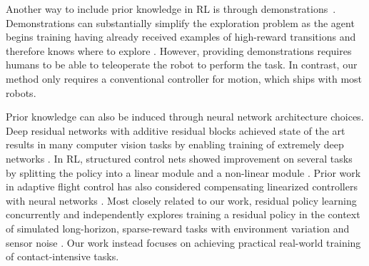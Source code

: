 Another way to include prior knowledge in RL is through demonstrations~\citep{peters2008baseball, kober2008mp, rajeswaran2018dextrous, hester17dqfd, vecerik17ddpgfd, nair2018demonstrations}. Demonstrations can substantially simplify the exploration problem as the agent begins training having already received examples of high-reward transitions and therefore knows where to explore \citep{subramanian2016efd}. However, providing demonstrations requires humans to be able to teleoperate the robot to perform the task. In contrast, our method only requires a conventional controller for motion, which ships with most robots.

Prior knowledge can also be induced through neural network architecture choices. Deep residual networks with additive residual blocks achieved state of the art results in many computer vision tasks by enabling training of extremely deep networks \citep{he2016resnet}. In RL, structured control nets showed improvement on several tasks by splitting the policy into a linear module and a non-linear module \citep{srouji18structuredcontrolnets}. Prior work in adaptive flight control has also considered compensating linearized controllers with neural networks \citep{johnson2000hedging}. Most closely related to our work, residual policy learning concurrently and independently explores training a residual policy in the context of simulated long-horizon, sparse-reward tasks with environment variation and sensor noise \citep{silver18residualpolicylearning}. Our work instead focuses on achieving practical real-world training of contact-intensive tasks.
